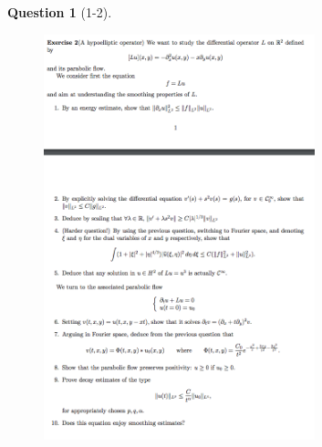 \documentclass[11pt]{article}
\theoremstyle{plain}
\theoremstyle{quest}
\newtheorem*{question}{Question}
\begin{document}
\newpage

\begin{question}[1-2]
\hfill
\begin{figure}[h!]
  \centering
    \includegraphics[width=0.7\textwidth]{pde2-f-p2.png}
\end{figure}
\end{question}
\end{document}
